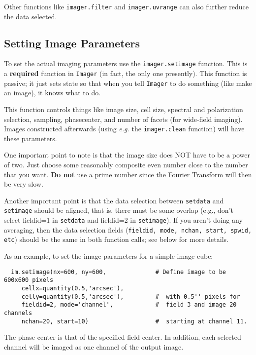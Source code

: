 Other functions like {\tt imager.filter} and {\tt imager.uvrange} can
also further reduce the data selected.

\subsection{Setting Image Parameters}
\label{section:imtool.setdata.setimage}

To set the actual imaging parameters use the {\tt imager.setimage}
function.  This is a {\bf required} function in {\tt Imager} (in fact,
the only one presently).  This function is passive; it just sets state
so that when you tell {\tt Imager} to do something (like make an
image), it knows what to do.

This function controls things like image size, cell size, spectral and
polarization selection, sampling, phasecenter, and number of facets
(for wide-field imaging).  Images constructed afterwards (using {\em
e.g.} the {\tt imager.clean} function) will have these parameters.

One important point to note is that the image size does NOT have to be
a power of two.  Just choose some reasonably composite even number
close to the number that you want.  {\bf Do not} use a prime number
since the Fourier Transform will then be very slow.

Another important point is that the data selection between {\tt setdata}
and {\tt setimage} should be aligned, that is, there must be some overlap
(e.g., don't select fieldid=1 in {\tt setdata} and fieldid=2 in {\tt setimage}).
If you aren't doing any averaging, then the data selection fields
({\tt fieldid, mode, nchan, start, spwid, etc}) should be the same in both
function calls; see below for more details.

As an example, to set the image parameters for a simple image cube:

\small
\begin{verbatim}
  im.setimage(nx=600, ny=600,              # Define image to be 600x600 pixels
     cellx=quantity(0.5,'arcsec'),
     celly=quantity(0.5,'arcsec'),         #  with 0.5'' pixels for
     fieldid=2, mode='channel',            #  field 3 and image 20 channels
     nchan=20, start=10)                   #  starting at channel 11.
\end{verbatim}
\normalsize

The phase center is that of the specified field center. In addition,
each selected channel will be imaged as one channel of the output
image.

